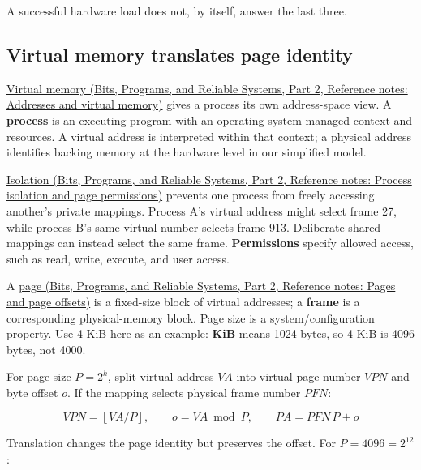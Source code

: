 A successful hardware load does not, by itself, answer the last three.

\subsection{Virtual memory translates page identity}\label{05-engine-i-ch002-virtual-memory-translates-page-identity}

\hypertarget{05-engine-i-ch002-virtual-memory-translates-page-identity}{}

\href{../01-Bits-Programs-and-Reliable-Systems-P02/main.pdf\#appendix-18ee4f913c3c}{Virtual memory (Bits, Programs, and Reliable Systems, Part 2, Reference notes: Addresses and virtual memory)} gives a process its own address-space view. A \textbf{process} is an executing program with an operating-system-managed context and resources. A virtual address is interpreted within that context; a physical address identifies backing memory at the hardware level in our simplified model.

\href{../01-Bits-Programs-and-Reliable-Systems-P02/main.pdf\#appendix-c2a9ad1e2b49}{Isolation (Bits, Programs, and Reliable Systems, Part 2, Reference notes: Process isolation and page permissions)} prevents one process from freely accessing another's private mappings. Process A's virtual address  might select frame 27, while process B's same virtual number selects frame 913. Deliberate shared mappings can instead select the same frame. \textbf{Permissions} specify allowed access, such as read, write, execute, and user access.

A \href{../01-Bits-Programs-and-Reliable-Systems-P02/main.pdf\#appendix-0c67cd5bf30a}{page (Bits, Programs, and Reliable Systems, Part 2, Reference notes: Pages and page offsets)} is a fixed-size block of virtual addresses; a \textbf{frame} is a corresponding physical-memory block. Page size is a system/configuration property. Use 4 KiB here as an example: \textbf{KiB} means 1024 bytes, so 4 KiB is 4096 bytes, not 4000.

For page size \(P=2^k\), split virtual address \(VA\) into virtual page number \(VPN\) and byte offset \(o\). If the mapping selects physical frame number \(PFN\):

\[
VPN=\left\lfloor VA/P\right\rfloor,\qquad
o=VA\bmod P,\qquad
PA=PFN\,P+o
\]

Translation changes the page identity but preserves the offset. For \(P=4096=2^{12}\):

